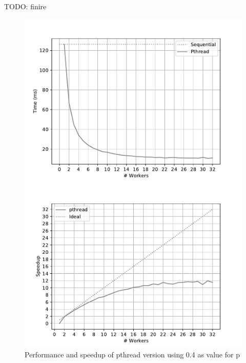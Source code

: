 TODO: finire

\begin{figure}
    \centering
    \begin{minipage}{0.48\textwidth}
        \includegraphics[width=\textwidth]{plots/pthread_performance_04_time.pdf}
    \end{minipage}
    \begin{minipage}{0.48\textwidth}
        \includegraphics[width=\textwidth]{plots/pthread_speedup_04_time.pdf}
    \end{minipage}
    \caption{Performance and speedup of pthread version using 0.4 as value for p}
    \label{fig:pthread_04}
\end{figure}
